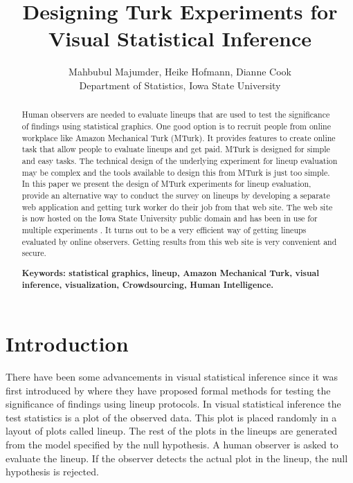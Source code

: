 \documentclass[11pt]{article}
\title{Designing Turk Experiments for Visual Statistical Inference}
\author{Mahbubul Majumder, Heike Hofmann, Dianne Cook\\
        Department of Statistics, Iowa State University}
\begin{document}
\tableofcontents

\maketitle


\begin {abstract} 

Human observers are needed to evaluate lineups that are used to test the significance of findings using statistical graphics. One good option is to recruit people from online workplace like Amazon Mechanical Turk (MTurk). It provides features to create online task that allow people to evaluate lineups and get paid. MTurk is designed for simple and easy tasks. The technical design of the underlying experiment for lineup evaluation may be complex and the tools available to design this from MTurk is just too simple. In this paper we present the design of MTurk experiments for lineup evaluation, provide an alternative way to conduct the survey on lineups by developing a separate web application and getting turk worker do their job from that web site. The web site is now hosted on the Iowa State University public domain and has been in use for multiple experiments \citep{majumder:turk}. It turns out to be a very efficient way of getting lineups evaluated by online observers. Getting results from this web site is very convenient and secure.

{\bf Keywords: \sf statistical graphics, lineup, Amazon Mechanical Turk, visual inference, visualization, Crowdsourcing, Human Intelligence.}

\end {abstract}


\section{Introduction} 

There have been some advancements in visual statistical inference since it was first introduced by \cite{buja:2009} where they have proposed formal methods for testing the significance of findings using lineup protocols. In visual statistical inference the test statistics is a plot of the observed data. This plot is placed randomly in a layout of plots called lineup. The rest of the plots in the lineups are generated from the model specified by the null hypothesis. A human observer is asked to evaluate the lineup. If the observer detects the actual plot in the lineup, the null hypothesis is rejected. 
\end{document}
